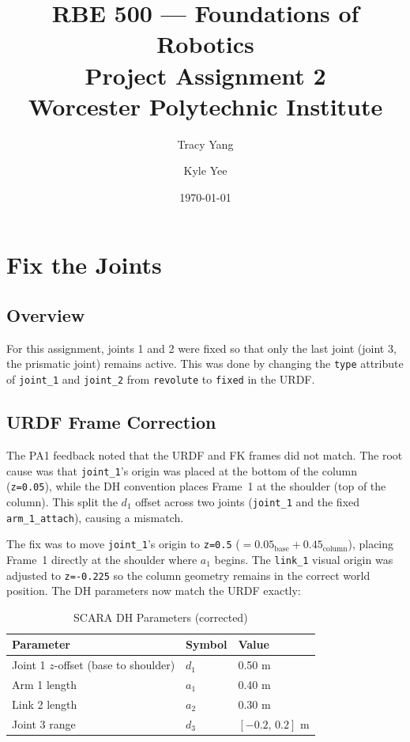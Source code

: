 \documentclass[12pt]{article}
\title{
    \vspace{-1cm}
    \large RBE 500 --- Foundations of Robotics \\[0.4em]
    \LARGE \textbf{Project Assignment 2} \\[0.4em]
    \large Worcester Polytechnic Institute
}
\author{Tracy Yang \and Kyle Yee}
\date{\today}
\begin{document}
\maketitle

\section{Fix the Joints}

\subsection{Overview}

For this assignment, joints 1 and 2 were fixed so that only the last joint
(joint 3, the prismatic joint) remains active. This was done by changing the
\texttt{type} attribute of \texttt{joint\_1} and \texttt{joint\_2} from
\texttt{revolute} to \texttt{fixed} in the URDF.

\subsection{URDF Frame Correction}

The PA1 feedback noted that the URDF and FK frames did not match. The root
cause was that \texttt{joint\_1}'s origin was placed at the bottom of the
column (\texttt{z=0.05}), while the DH convention places Frame~1 at the
shoulder (top of the column). This split the $d_1$ offset across two joints
(\texttt{joint\_1} and the fixed \texttt{arm\_1\_attach}), causing a mismatch.

The fix was to move \texttt{joint\_1}'s origin to \texttt{z=0.5}
($= 0.05_{\text{base}} + 0.45_{\text{column}}$), placing Frame~1 directly at
the shoulder where $a_1$ begins. The \texttt{link\_1} visual origin was adjusted
to \texttt{z=-0.225} so the column geometry remains in the correct world
position. The DH parameters now match the URDF exactly:

\begin{table}[H]
\centering
\caption{SCARA DH Parameters (corrected)}
\label{tab:dh}
\begin{tabular}{lll}
\toprule
\textbf{Parameter} & \textbf{Symbol} & \textbf{Value} \\
\midrule
Joint 1 $z$-offset (base to shoulder) & $d_1$ & 0.50 m \\
Arm 1 length                           & $a_1$ & 0.40 m \\
Link 2 length                          & $a_2$ & 0.30 m \\
Joint 3 range                          & $d_3$ & $[-0.2,\, 0.2]$ m \\
\bottomrule
\end{tabular}
\end{table}
\end{document}
